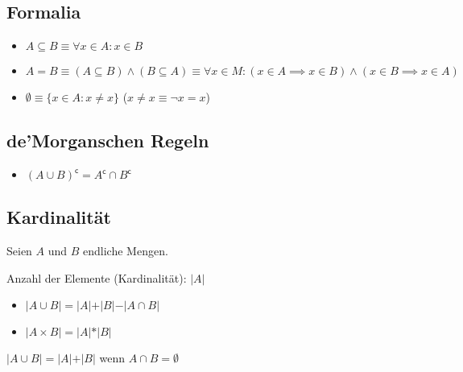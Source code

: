 \documentclass[12pt]{scrreprt}
\begin{document}
            \subsection{Formalia}
                \label{ss:grundbegriffe_mengen_formalia}

                \begin{itemize}
                    \item $ A \subseteq B \equiv \forall x \in A : x \in B $
                    \item $ A = B \equiv (A \subseteq B) \land (B \subseteq A) \equiv \forall x \in M : (x \in A \implies x \in B ) \land (x \in B \implies x \in A) $
                    \item $ \emptyset \equiv \{ x \in A : x \neq x \} $ ($ x \neq x \equiv \lnot x = x $)
                \end{itemize}


            \subsection{de'Morganschen Regeln}
                \label{ss:grundbegriffe_mengen_demorgan}

                \begin{itemize}
                    \item $ (A \cup B) ^ \mathsf{c} = A ^ \mathsf{c} \cap B ^ \mathsf{c} $
                \end{itemize}


            \subsection{Kardinalität}
                \label{ss:grundbegriffe_mengen_kradinalitaet}

                Seien $ A $ und $ B $ endliche Mengen.

                Anzahl der Elemente (Kardinalität): $ \vert A \vert $

                \begin{itemize}
                    \item $ \vert A \cup B \vert = \vert A \vert + \vert B \vert - \vert A \cap B \vert $
                    \item $ \vert A \times B \vert = \vert A \vert * \vert B \vert $
                \end{itemize}

                $ \vert A \cup B \vert = \vert A \vert + \vert B \vert $ wenn $ A \cap B = \emptyset $
\end{document}
